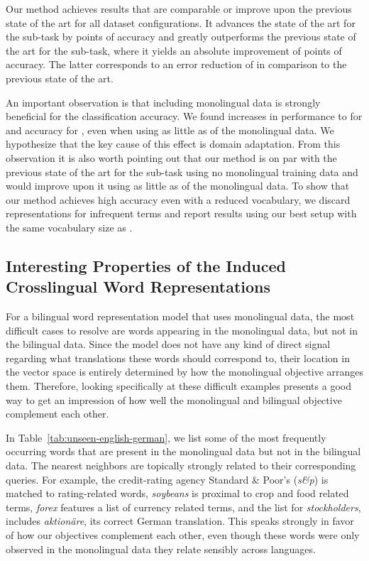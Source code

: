\documentclass{article} \usepackage{iclr2015,times}
\begin{document}
Our method achieves results that are comparable or improve upon
the previous state of the art for all dataset configurations.
It advances the state of the art for the  
sub-task by  points of accuracy and greatly outperforms the 
previous state of the art for the  sub-task,
where it yields an absolute improvement of  
points of accuracy.
The latter corresponds to an error reduction of  in comparison 
to the previous state of the art.

An important observation is that including monolingual data is strongly
beneficial for the classification accuracy.
We found increases in performance to  for  and
 accuracy for , even when using as little
as  of the monolingual data.
We hypothesize that the key cause of this effect is domain adaptation.
From this observation it is also worth pointing out that our method is on par
with the previous state of the art for the  sub-task 
using no monolingual training data and would improve upon it
using as little as  of the monolingual data.
To show that our method achieves high accuracy even with a reduced vocabulary,
we discard representations for infrequent terms and report results using our
best setup with the same vocabulary size as \citet{klementiev2012inducing}.

\subsection{Interesting Properties of the Induced Crosslingual Word Representations}

For a bilingual word representation model that uses monolingual data,
the most difficult cases to resolve are words appearing in
the monolingual data, but not in the bilingual data.
Since the model does not have any kind of direct signal
regarding what translations these words should correspond to,
their location in the vector space is entirely determined
by how the monolingual objective arranges them.
Therefore, looking specifically at these difficult examples presents a
good way to get an impression of how well the monolingual and
bilingual objective complement each other.

In Table~\ref{tab:unseen-english-german},
we list some of the most frequently occurring words that are present
in the monolingual data but not in the bilingual data.
The nearest neighbors are topically strongly related to their corresponding
queries.
For example, the credit-rating agency Standard \& Poor's
(\emph{s\&p}) is matched to rating-related words, \emph{soybeans} is proximal
to crop and food related terms, \emph{forex} features a list of currency
related terms, and the list for \emph{stockholders},
includes \emph{aktion\"are}, its correct German translation.
This speaks strongly in favor of how our objectives complement each other,
even though these words were only observed in the monolingual
data they relate sensibly across languages.
\end{document}
